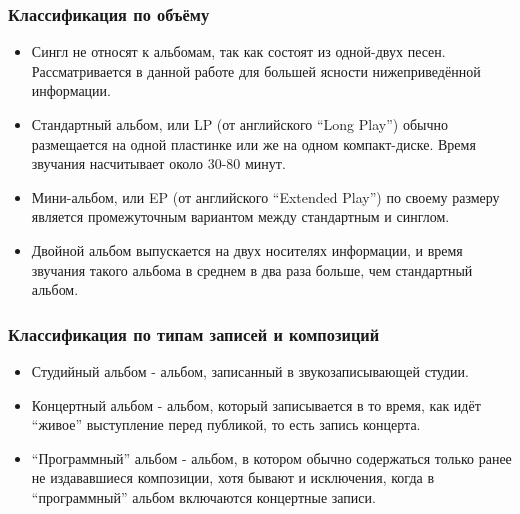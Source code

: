 \subsubsection{Классификация по объёму}
\label{sub:domain:music_album:volume_classification}
\begin{itemize}
  \item Сингл не относят к альбомам, так как состоят из одной-двух песен. Рассматривается в данной работе для большей ясности нижеприведённой информации.
  \item Стандартный альбом, или LP (от английского “Long Play”) обычно размещается на одной пластинке или же на одном компакт-диске. Время звучания насчитывает около 30-80 минут.
  \item Мини-альбом, или EP (от английского “Extended Play”) по своему размеру является промежуточным вариантом между стандартным и синглом.
  \item Двойной альбом выпускается на двух носителях информации, и время звучания такого альбома в среднем в два раза больше, чем стандартный альбом.
\end{itemize}

\subsubsection{Классификация по типам записей и композиций}
\label{sub:domain:music_album:records_type_classification}
\begin{itemize}
  \item Студийный альбом - альбом, записанный в звукозаписывающей студии.
  \item Концертный альбом - альбом, который записывается в то время, как идёт “живое” выступление перед публикой, то есть запись концерта.
  \item “Программный” альбом - альбом, в котором обычно содержаться только ранее не издававшиеся композиции, хотя бывают и исключения, когда в “программный” альбом включаются концертные записи.
\end{itemize}

